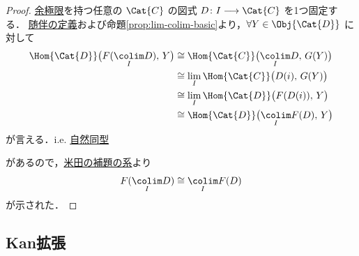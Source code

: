\documentclass[TQFT_main]{subfiles}
\begin{document}
\begin{proof}
    \hyperref[def:colim]{余極限}を持つ任意の $\Cat{C}$ の図式 $D \colon I \lto \Cat{C}$ を1つ固定する．
    \hyperref[def:adjoint]{随伴の定義}および命題\ref{prop:lim-colim-basic}より，$\forall Y \in \Obj{\Cat{D}}$ に対して
    \begin{align}
        \Hom{\Cat{D}} \bigl( F(\underset{I}{\colim} D),\, Y \bigr) 
        &\cong \Hom{\Cat{C}} \bigl( \underset{I}{\colim} D,\, G(Y) \bigr) \\
        &\cong \lim_I \Hom{\Cat{C}} \bigl( D(i),\, G(Y) \bigr) \\
        &\cong \lim_I \Hom{\Cat{D}} \bigl( F(D(i)),\, Y \bigr) \\
        &\cong \Hom{\Cat{D}} \bigl( \underset{I}{\colim} F(D),\, Y \bigr) 
    \end{align}
    が言える．i.e. \hyperref[def:iso]{自然同型}
    \begin{center}
    \end{center}
    があるので，\hyperref[col:Yoneda]{米田の補題の系}より
    \begin{align}
        F(\underset{I}{\colim} D) \cong \underset{I}{\colim} F(D)
    \end{align}
    が示された．
\end{proof}

\subsection{Kan拡張}
\end{document}

